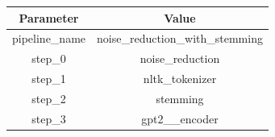 \begin{tabular}{|c||c|}
\toprule
Parameter & Value \\ \midrule
\midrule
pipeline\_name & noise\_reduction\_with\_stemming \\ \midrule
step\_0 & noise\_reduction \\ \midrule
step\_1 & nltk\_tokenizer \\ \midrule
step\_2 & stemming \\ \midrule
step\_3 & gpt2\_\_encoder \\ \midrule
\bottomrule
\end{tabular}
